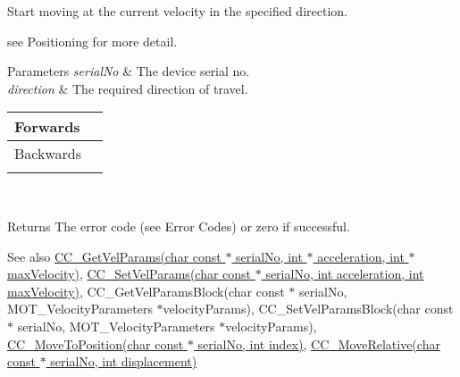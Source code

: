 Start moving at the current velocity in the specified direction. 

see Positioning for more detail.


\begin{DoxyParams}{Parameters}
{\em serial\+No} & The device serial no. \\
\hline
{\em direction} & The required direction of travel. \begin{tabularx}{\linewidth}{|*{2}{>{\raggedright\arraybackslash}X|}}\hline
Forwards&1 \\\cline{1-2}
Backwards&2 \\\cline{1-2}
\end{tabularx}
\\
\hline
\end{DoxyParams}
\begin{DoxyReturn}{Returns}
The error code (see Error Codes) or zero if successful. 
\end{DoxyReturn}
\begin{DoxySeeAlso}{See also}
\hyperlink{group___k_cube_d_c_servo_ga7bea9a9b3a422356f7f3078321e441e0}{C\+C\+\_\+\+Get\+Vel\+Params(char const $\ast$ serial\+No, int $\ast$ acceleration, int $\ast$ max\+Velocity)}, \hyperlink{group___k_cube_d_c_servo_ga6ad44d4b6adb29641a54f854ea8574d0}{C\+C\+\_\+\+Set\+Vel\+Params(char const $\ast$ serial\+No, int acceleration, int max\+Velocity)}, C\+C\+\_\+\+Get\+Vel\+Params\+Block(char const $\ast$ serial\+No, M\+O\+T\+\_\+\+Velocity\+Parameters  $\ast$velocity\+Params), C\+C\+\_\+\+Set\+Vel\+Params\+Block(char const $\ast$ serial\+No, M\+O\+T\+\_\+\+Velocity\+Parameters $\ast$velocity\+Params), \hyperlink{group___k_cube_d_c_servo_ga294eb4ddacc640b77ae2cfcd9b0dca70}{C\+C\+\_\+\+Move\+To\+Position(char const $\ast$ serial\+No, int index)}, \hyperlink{group___k_cube_d_c_servo_ga5c46e55b5a129617bcf8f805471450a1}{C\+C\+\_\+\+Move\+Relative(char const $\ast$ serial\+No, int displacement)}


\end{DoxySeeAlso}

\begin{DoxyCodeInclude}
\end{DoxyCodeInclude}
